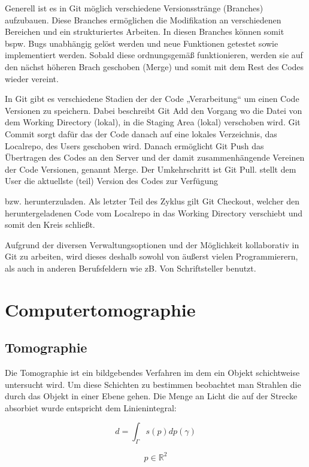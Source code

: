 \documentclass[]{dsadokumentation}
\begin{document}
Generell ist es in Git möglich verschiedene Versionsstränge (Branches) aufzubauen. Diese Branches ermöglichen die Modifikation an verschiedenen Bereichen und ein strukturiertes Arbeiten. In diesen Branches können somit bspw. Bugs unabhängig gelöst werden und neue Funktionen getestet sowie implementiert werden. Sobald diese ordnungsgemäß funktionieren, werden sie auf den nächst höheren Brach geschoben (Merge) und somit mit dem Rest des Codes wieder vereint.

In Git gibt es verschiedene Stadien der der Code „Verarbeitung“ um einen Code Versionen zu speichern. Dabei beschreibt Git Add den Vorgang wo die Datei von dem Working Directory (lokal), in die Staging Area (lokal) verschoben wird. Git Commit sorgt dafür das der Code danach auf eine lokales Verzeichnis, das Localrepo, des Users geschoben wird. Danach ermöglicht Git Push das Übertragen des Codes an den Server und der damit zusammenhängende Vereinen der Code Versionen, genannt Merge. Der Umkehrschritt ist Git Pull. stellt dem User die aktuellste (teil) Version des Codes zur Verfügung

bzw. herunterzuladen. Als letzter Teil des Zyklus gilt Git Checkout, welcher den heruntergeladenen Code vom Localrepo in das Working Directory verschiebt und somit den Kreis schließt.

Aufgrund der diversen Verwaltungsoptionen und der Möglichkeit kollaborativ in Git zu arbeiten, wird dieses deshalb sowohl von äußerst vielen Programmierern, als auch in anderen Berufsfeldern wie zB. Von Schriftsteller benutzt.

\section{Computertomographie}


\subsection{Tomographie}

Die Tomographie ist ein bildgebendes Verfahren im dem ein Objekt schichtweise untersucht wird. Um diese Schichten zu bestimmen beobachtet man Strahlen die durch das Objekt in einer Ebene gehen. Die Menge an Licht die auf der Strecke absorbiet wurde entspricht dem Linienintegral:

$$d=\int_{\Gamma}{}s(p)dp(\gamma)$$

$$p\in \mathbb{R}^2$$
\end{document}
